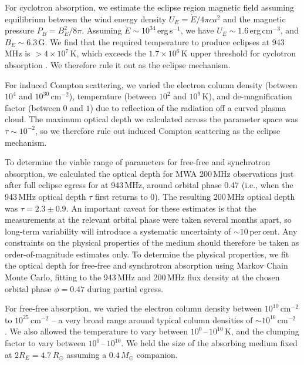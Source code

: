 \documentclass[fleqn,usenatbib]{mnras}
\newcommand{\todo}[1]{\textcolor{red}{TODO: #1}\PackageWarning{TODO:}{#1!}}
\begin{document}
For cyclotron absorption, we estimate the eclipse region magnetic field assuming equilibrium between the wind energy density $U_E = \dot{E}/4\pi c a^{2}$ and the magnetic pressure $P_B = B_E^2 / 8\pi$. Assuming $\dot{E}\sim 10^{34}$\,erg\,s$^{-1}$, we have $U_E \sim 1.6$\,erg\,cm$^{-3}$, and $B_E\sim 6.3$\,G. We find that the required temperature to produce eclipses at 943\,MHz is $>4\times10^7$\,K, which exceeds the $1.7\times10^{6}$\,K upper threshold for cyclotron absorption \citep{1994ApJ...422..304T}. We therefore rule it out as the eclipse mechanism.

For induced Compton scattering, we varied the electron column density (between $10^4$ and $10^{30}$\,cm$^{-2}$), temperature (between $10^2$ and $10^9$\,K), and de-magnification factor (between $0$ and $1$) due to reflection of the radiation off a curved plasma cloud. The maximum optical depth we calculated across the parameter space was $\tau \sim 10^{-2}$, so we therefore rule out induced Compton scattering as the eclipse mechanism.

To determine the viable range of parameters for free-free and synchrotron absorption, we calculated the optical depth for MWA 200\,MHz observations just after full eclipse egress for at 943\,MHz, around orbital phase 0.47 (i.e., when the 943\,MHz optical depth $\tau$ first returns to 0). The resulting 200\,MHz optical depth was $\tau = 2.3\pm0.9$. An important caveat for these estimates is that the measurements at the relevant orbital phase were taken several months apart, so long-term variability will introduce a systematic uncertainty of $\sim 10$\,per\,cent. Any constraints on the physical properties of the medium should therefore be taken as order-of-magnitude estimates only. To determine the physical properties, we fit the optical depth for free-free and synchrotron absorption using Markov Chain Monte Carlo, fitting to the 943\,MHz and 200\,MHz flux density at the chosen orbital phase $\phi = 0.47$ during partial egress.

For free-free absorption, we varied the electron column density between $10^{10}\,\mathrm{cm}^{-2}$ to $10^{25}\,\mathrm{cm}^{-2}$ -- a very broad range around typical column densities of $\sim 10^{16}\,\mathrm{cm}^{-2}$ \citep[e.g.][]{1996ApJ...465L.119S,2022MNRAS.513.1794B}. We also allowed the temperature to vary between $10^0$\,--\,$10^{10}$\,K, and the clumping factor to vary between $10^0$\,--\,$10^{10}$. We held the size of the absorbing medium fixed at $2R_E = 4.7\,R_\odot$ assuming a $0.4\,M_\odot$ companion. %
\end{document}
